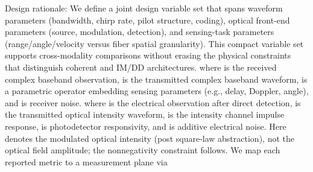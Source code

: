 {}\markdownRendererSectionBegin
{}\markdownRendererInterblockSeparator
{}Design rationale: We define a joint design variable set that spans waveform parameters (bandwidth, chirp rate, pilot structure, coding), optical front-end parameters (source, modulation, detection), and sensing-task parameters (range/angle/velocity versus fiber spatial granularity). This compact variable set supports cross-modality comparisons without erasing the physical constraints that distinguish coherent and IM/DD architectures.\markdownRendererParagraphSeparator
{}\markdownRendererSoftLineBreak
{}\markdownRendererSoftLineBreak
{}where  is the received complex baseband observation,  is the transmitted complex baseband waveform,  is a parametric operator embedding sensing parameters \markdownRendererInlineMath{\boldsymbol{\theta}} (e.g., delay, Doppler, angle), and  is receiver noise.\markdownRendererParagraphSeparator
{}\markdownRendererSoftLineBreak
{}\markdownRendererSoftLineBreak
{}where  is the electrical observation after direct detection,  is the transmitted optical intensity waveform,  is the intensity channel impulse response,  is photodetector responsivity, and  is additive electrical noise. Here  denotes the modulated optical intensity (post square-law abstraction), not the optical field amplitude; the nonnegativity constraint follows.\markdownRendererParagraphSeparator
{} We map each reported metric  to a measurement plane via\markdownRendererSoftLineBreak
{}\markdownRendererSoftLineBreak
